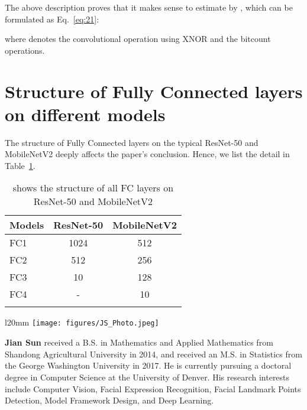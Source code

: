 \documentclass[sn-mathphys,iicol,Numbered]{sn-jnl}
\begin{document}
\begin{appendices}
The above description proves that it makes sense to estimate  by , which can be formulated as Eq.~\ref{eq:21}:
\vspace{-0.2cm}

where  denotes the convolutional operation using XNOR and the bitcount operations. 

\section{Structure of Fully Connected layers on different models}
\label{appendix:C}

The structure of Fully Connected layers on the typical ResNet-50 and MobileNetV2 deeply affects the paper's conclusion. Hence, we list the detail in Table~\ref{tab:fc_structure}.

\begin{table}[ht]
\caption{shows the structure of all FC layers on ResNet-50 and MobileNetV2}\label{tab:fc_structure}
\begin{tabular}{@{}l|c|c@{}}
\toprule
Models & ResNet-50 & MobileNetV2 \\
\midrule
FC1 & 1024 & 512 \\
FC2 & 512 & 256 \\
FC3 & 10 & 128 \\
FC4 & - & 10 \\ 
\botrule
\end{tabular}
\end{table}







\end{appendices}





\begin{wrapfigure}{l}{20mm} 
\texttt{[image: figures/JS\_Photo.jpeg]}
\end{wrapfigure}\par
\textbf{Jian Sun} received a B.S. in Mathematics and Applied Mathematics from Shandong Agricultural University in 2014, and received an M.S. in Statistics from the George Washington University in 2017. He is currently pursuing a doctoral degree in Computer Science at the University of Denver. His research interests include Computer Vision, Facial Expression Recognition, Facial Landmark Points Detection, Model Framework Design, and Deep Learning.
\end{document}
